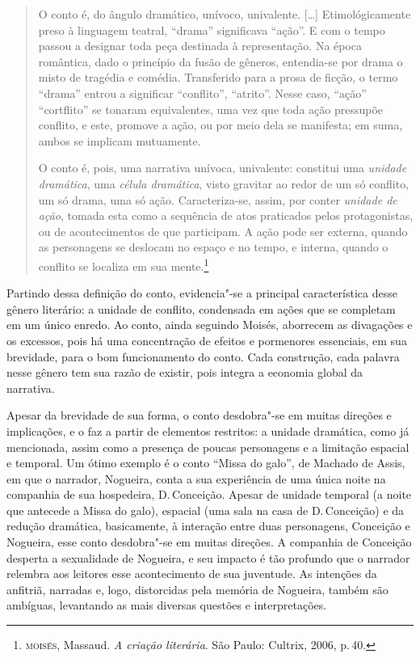 \begin{quote}
O conto é, do ângulo dramático, unívoco, univalente. [\ldots]
Etimológicamente preso à linguagem teatral,
``drama'' significava ``ação''. E com o tempo passou a designar
toda peça destinada à representação. Na época romântica, dado o
princípio da fusão de gêneros, entendia-se por drama o misto de
tragédia e comédia. Transferido para a prosa de ficção, o termo
``drama'' entrou a significar ``conflito'', ``atrito''. Nesse caso,
``ação'' ``cortflito'' se tonaram equivalentes, uma vez que toda
ação pressupõe conflito, e este, promove a ação, ou por meio dela
se manifesta; em suma, ambos se implicam mutuamente.

O conto é, pois, uma narrativa unívoca, univalente: constitui
uma \textit{unidade dramática}, uma \textit{célula dramática}, visto gravitar ao
redor de um só conflito, um só drama, uma só ação. Caracteriza-se,
assim, por conter \textit{unidade de ação}, tomada esta como a sequência de atos praticados pelos protagonistas, ou de acontecimentos de
que participam. A ação pode ser externa, quando as personagens se
deslocam no espaço e no tempo, e interna, quando o conflito se
localiza em sua mente.\footnote{\textsc{moisés}, Massaud. \textit{A criação literária}. São Paulo: Cultrix, 2006, p.\,40.}
\end{quote}

Partindo dessa definição do conto, evidencia"-se a principal característica desse gênero literário: a unidade de conflito, condensada em ações que se completam em um único enredo. Ao conto, ainda seguindo Moisés, aborrecem as divagações e os excessos, pois há uma concentração de efeitos e pormenores essenciais, em sua brevidade, para o bom funcionamento do conto.
Cada construção, cada palavra nesse gênero tem sua razão de existir, pois integra a economia global da narrativa.

Apesar da brevidade de sua forma, o conto desdobra"-se em muitas direções e implicações, e o faz a partir de elementos restritos: a unidade dramática, como já mencionada, assim como a presença de poucas personagens e a limitação espacial e temporal. Um ótimo exemplo é o conto ``Missa do galo'', de Machado de Assis, em que o narrador, Nogueira, conta a sua experiência de uma única noite na companhia de sua hospedeira, D.\,Conceição. Apesar de unidade temporal (a noite que antecede a Missa do galo), espacial (uma sala na casa de D.\,Conceição) e da redução dramática, basicamente, à interação entre duas personagens, Conceição e Nogueira, esse conto desdobra"-se em muitas direções. A companhia de Conceição desperta a sexualidade de Nogueira, e seu impacto é tão profundo que o narrador relembra aos leitores esse acontecimento de sua juventude. As intenções da anfitriã, narradas e, logo, distorcidas pela memória de Nogueira, também são ambíguas, levantando as mais diversas questões e interpretações.

